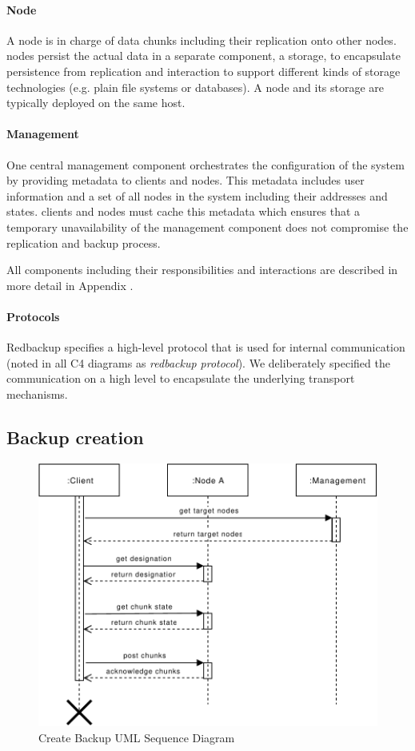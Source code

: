 \paragraph{Node}
A \gls{node} is in charge of data \glspl{chunk} including their replication onto other \glspl{node}. \Glspl{node} persist the actual data in a separate component, a \gls{storage}, to encapsulate persistence from replication and interaction to support different kinds of storage technologies (e.g. plain file systems or databases). A \gls{node} and its \gls{storage} are typically deployed on the same host.

\paragraph{Management}
One central \gls{management} component orchestrates the configuration of the system by providing metadata to \glspl{client} and \glspl{node}. This metadata includes user information and a set of all \glspl{node} in the system including their addresses and states. \Glspl{client} and \glspl{node} must cache this metadata which ensures that a temporary unavailability of the \gls{management} component does not compromise the replication and backup process.

All components including their responsibilities and interactions are described in more detail in Appendix .

\paragraph{Protocols} Redbackup specifies a high-level protocol that is used for internal communication (noted in all C4 diagrams as \emph{redbackup protocol}). We deliberately specified the communication on a high level to encapsulate the underlying transport mechanisms.

\subsection{Backup creation}
\begin{figure}[h]
    \centering
    \includegraphics[width=\linewidth]{resources/create_backup}
    \caption{Create Backup UML Sequence Diagram}
\end{figure}

